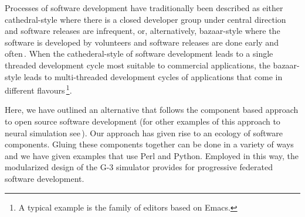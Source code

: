 \documentclass[12pt]{article}
\begin{document}
Processes of software development have traditionally been described as
either cathedral-style where there is a closed developer group under
central direction and software releases are infrequent, or,
alternatively, bazaar-style where the software is developed by
volunteers and software releases are done early and
often\,\cite{raymond01:_cathed_bazaar, citeulike:126678}.
When the cathederal-style of software development leads to a single
threaded development cycle most suitable to commercial applications,
the bazaar-style leads to multi-threaded development cycles of
applications that come in different flavours\,\footnote{A typical
  example is the family of editors based on Emacs.}.

Here, we have outlined an alternative that follows the component based
approach to open source software development (for other examples of
this approach to neural simulation see\,\cite{schuermann09:_neuron,
  nordlie09:_visual}).  Our approach has given rise to an ecology of
software components.  Gluing these components together can be done in
a variety of ways and we have given examples that use Perl and Python.
Employed in this way, the modularized design of the G-3 simulator
provides for progressive federated software development.


\end{document}
